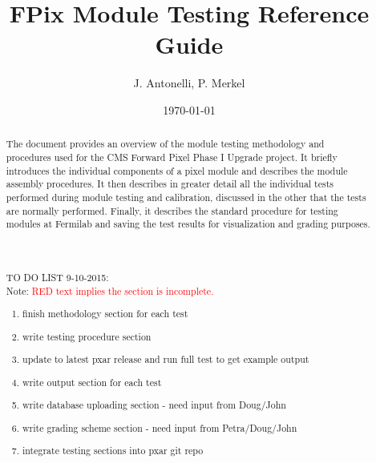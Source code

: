 \documentclass{scrartcl}
\title{FPix Module Testing Reference Guide} %
\author{
J. Antonelli, 
P. Merkel
} %
\date{\today} %
\begin{document}
\maketitle %


\begin{abstract}
The document provides an overview of the module testing methodology and procedures used for the CMS Forward Pixel Phase I Upgrade project. 
It briefly introduces the individual components of a pixel module and describes the module assembly procedures.
It then describes in greater detail all the individual tests performed during module testing and calibration, discussed in the other that the tests are normally performed. 
Finally, it describes the standard procedure for testing modules at Fermilab and saving the test results for visualization and grading purposes.
\\\\\\\\
TO DO LIST 9-10-2015:
\\
Note: \textcolor{red}{RED text implies the section is incomplete.}
\begin{enumerate}
\item finish methodology section for each test
\item write testing procedure section
\item update to latest pxar release and run full test to get example output
\item write output section for each test
\item write database uploading section - need input from Doug/John
\item write grading scheme section - need input from Petra/Doug/John
\item integrate testing sections into pxar git repo
\end{enumerate}

\end{abstract}

\newpage
\tableofcontents

\newpage









%  
\end{document}
